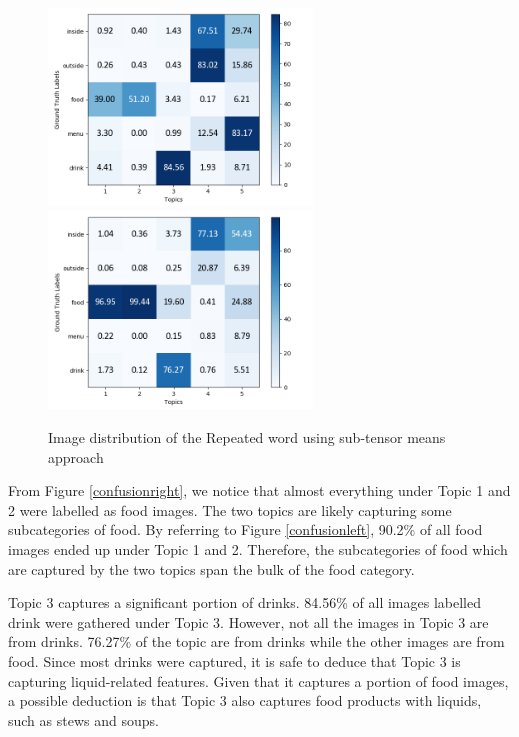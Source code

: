 \documentclass{article}
\begin{document}
\begin{figure}
\centering
{}
{%
    \includegraphics[width=7cm]{confusiona.png}
    \hspace{0.02\columnwidth}
}%
{%
    \includegraphics[width=7cm]{confusionb.png}
    \hspace*{\fill}
}%
\caption{Image distribution of the Repeated word using sub-tensor means approach} \label{img:confusion}
\end{figure}

From Figure \ref{confusionright}, we notice that almost everything under Topic 1 and 2 were labelled as food images. The two topics are likely capturing some subcategories of food. By referring to Figure \ref{confusionleft}, 90.2\% of all food images ended up under Topic 1 and 2. Therefore, the subcategories of food which are captured by the two topics span the bulk of the food category.

Topic 3 captures a significant portion of drinks. 84.56\% of all images labelled drink were gathered under Topic 3. However, not all the images in Topic 3 are from drinks. 76.27\% of the topic are from drinks while the other images are from food. Since most drinks were captured, it is safe to deduce that Topic 3 is capturing liquid-related features. Given that it captures a portion of food images, a possible deduction is that Topic 3 also captures food products with liquids, such as stews and soups.
\end{document}
